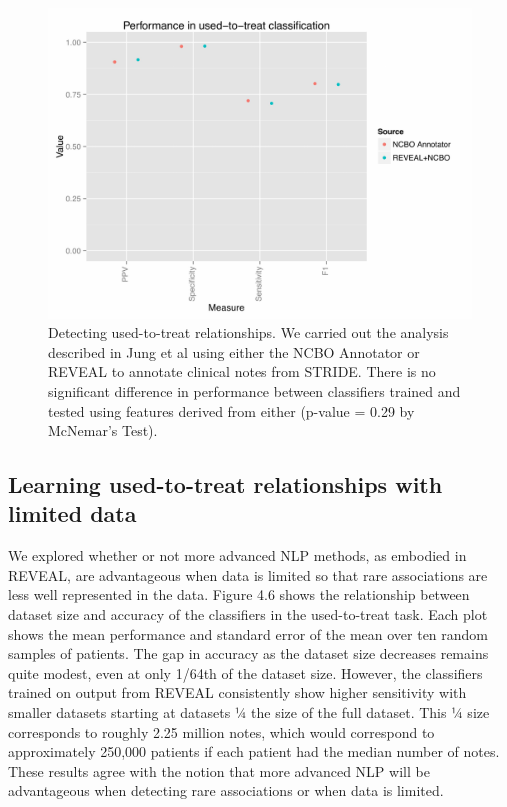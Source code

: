 \begin{figure}
  \begin{center}
    \includegraphics[width=0.9\linewidth]{ch4-figures/Figure5.pdf}
  \end{center}
  \caption[Detecting used-to-treat relationships]{Detecting
    used-to-treat relationships.  We carried out the analysis
    described in Jung et al using either the NCBO Annotator or REVEAL
    to annotate clinical notes from STRIDE.  There is no significant
    difference in performance between classifiers trained and tested
    using features derived from either (p-value = 0.29 by McNemar’s
    Test).}
  \label{fig:short}
\end{figure}


\subsection{Learning used-to-treat relationships with limited data}
We explored whether or not more advanced NLP methods, as embodied in
REVEAL, are advantageous when data is limited so that rare
associations are less well represented in the data.  Figure 4.6 shows
the relationship between dataset size and accuracy of the classifiers
in the used-to-treat task.  Each plot shows the mean performance and
standard error of the mean over ten random samples of patients.  The
gap in accuracy as the dataset size decreases remains quite modest,
even at only 1/64th of the dataset size.  However, the classifiers
trained on output from REVEAL consistently show higher sensitivity
with smaller datasets starting at datasets ¼ the size of the full
dataset.  This ¼ size corresponds to roughly 2.25 million notes, which
would correspond to approximately 250,000 patients if each patient had
the median number of notes. These results agree with the notion that
more advanced NLP will be advantageous when detecting rare
associations or when data is limited.

